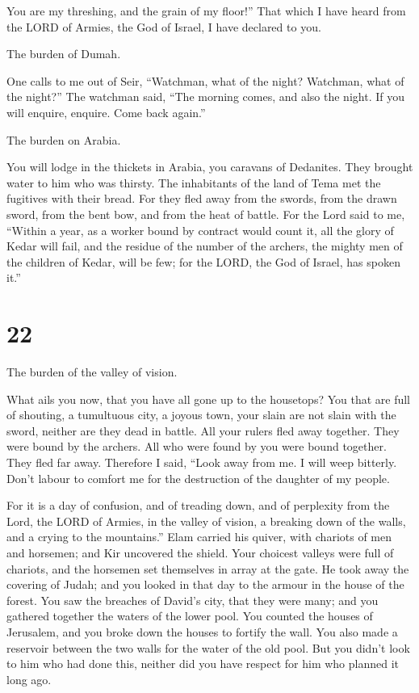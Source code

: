  You are my threshing, and the grain of my floor!'' That
which I have heard from the LORD of Armies, the God of Israel, I have
declared to you.

 The burden of Dumah.

One calls to me out of Seir, ``Watchman, what of the night? Watchman,
what of the night?''  The watchman said, ``The morning
comes, and also the night. If you will enquire, enquire. Come back
again.''

 The burden on Arabia.

You will lodge in the thickets in Arabia, you caravans of Dedanites.
 They brought water to him who was thirsty. The inhabitants
of the land of Tema met the fugitives with their bread. 
For they fled away from the swords, from the drawn sword, from the bent
bow, and from the heat of battle.  For the Lord said to me,
``Within a year, as a worker bound by contract would count it, all the
glory of Kedar will fail,  and the residue of the number of
the archers, the mighty men of the children of Kedar, will be few; for
the LORD, the God of Israel, has spoken it.''

\hypertarget{section-21}{%
\section{22}\label{section-21}}

 The burden of the valley of vision.

What ails you now, that you have all gone up to the housetops?
 You that are full of shouting, a tumultuous city, a joyous
town, your slain are not slain with the sword, neither are they dead in
battle.  All your rulers fled away together. They were bound
by the archers. All who were found by you were bound together. They fled
far away.  Therefore I said, ``Look away from me. I will
weep bitterly. Don't labour to comfort me for the destruction of the
daughter of my people.

 For it is a day of confusion, and of treading down, and of
perplexity from the Lord, the LORD of Armies, in the valley of vision, a
breaking down of the walls, and a crying to the mountains.''
 Elam carried his quiver, with chariots of men and horsemen;
and Kir uncovered the shield.  Your choicest valleys were
full of chariots, and the horsemen set themselves in array at the gate.
 He took away the covering of Judah; and you looked in that
day to the armour in the house of the forest.  You saw the
breaches of David's city, that they were many; and you gathered together
the waters of the lower pool.  You counted the houses of
Jerusalem, and you broke down the houses to fortify the wall.
 You also made a reservoir between the two walls for the
water of the old pool. But you didn't look to him who had done this,
neither did you have respect for him who planned it long ago.

